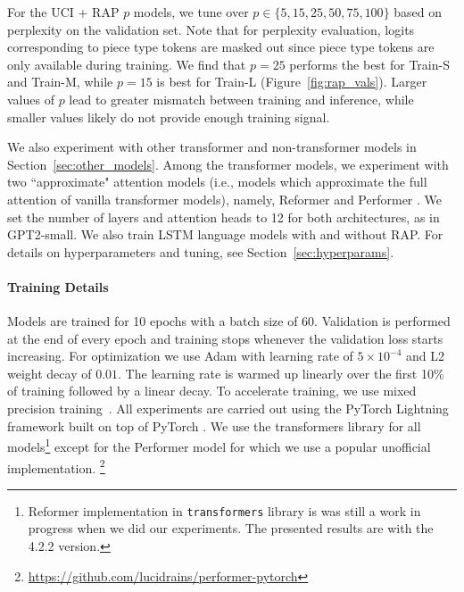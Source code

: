 \documentclass[12pt]{thesis-umich}[thesis]
\newcommand{\pos}[1]{\texttt{#1}}
\begin{document}
For the UCI + RAP $p$ models, we tune over $p \in \{5, 15, 25, 50, 75, 100\}$ based on perplexity on the validation set.
Note that for perplexity evaluation, logits corresponding to piece type tokens are masked out since piece type tokens are only available during training.
We find that $p=25$ performs the best for Train-S and Train-M, while $p=15$ is best for Train-L (Figure~\ref{fig:rap_vals}). Larger values of $p$ lead to greater mismatch between training and inference, while smaller values likely do not provide enough training signal.

We also experiment with other transformer and non-transformer models in Section~\ref{sec:other_models}.
Among the transformer models, we experiment with two ``approximate" attention models (i.e., models which approximate the full attention of vanilla transformer models), namely, Reformer \cite{kitaev2020reformer} and Performer \cite{choromanski2021rethinking}.  
We set the number of layers and attention heads to 12 for both 
architectures, as in GPT2-small.
We also train LSTM language models with and without RAP. 
For details on hyperparameters and tuning, see Section~\ref{sec:hyperparams}.


\paragraph{Training Details}
Models are trained for 10 epochs with a batch size of 60. Validation is performed at the end of every epoch and training stops whenever the validation loss starts increasing.
For optimization we use Adam \citep{kingma2014adam} with learning rate of $5\times10^{-4}$ and L2 weight decay of $0.01$.
The learning rate is warmed up linearly over the first 10\% of training followed by a linear decay.
To accelerate training, we use mixed precision training~\citep{micikevicius2018mixed}. All experiments are carried out using the PyTorch Lightning framework built on top of PyTorch \citep{falcon2019pytorch, pytorch}.
We use the transformers library \citep{Wolf2019HuggingFacesTS} for all models\footnote{Reformer implementation in \pos{transformers} library is was still a work in progress when we did our experiments. The presented results are with the 4.2.2 version.} except for the Performer model for which we use a popular unofficial implementation.
\footnote{\url{https://github.com/lucidrains/performer-pytorch}}
\end{document}
